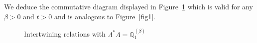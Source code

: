 \documentclass[10pt]{amsart}
\theoremstyle{definition}\newtheorem{defi}[theo]{Definition}\newtheorem{rema}[theo]{Remark}\newtheorem{exam}[theo]{Example}\newtheorem{exem}[theo]{Example}\newtheorem{nota}[theo]{Notation}
\newcommand{\fm}{\mathfrak{m}}
\newcommand{\dBs}{{\discret{Q}}}
\newcommand{\Bs}{Q}
\newcommand{\esL}{\mathbf{L}}
\newcommand{\esLd}{\ell}
\newcommand{\discret}[1]{\mathds{#1}}
\newcommand{\adjL}{\Lambda^*}
\begin{document}
We deduce the commutative diagram displayed in Figure~\ref{fig2} which is valid for any $\beta>0$ and $t>0$ and is analogous to Figure~\ref{fig1}.

\begin{figure}[ht]\centering
{}
\caption{Intertwining relations with $\adjL \Lambda=\dBs^{(\beta)}_1$}\label{fig2}
\end{figure}
\end{document}
